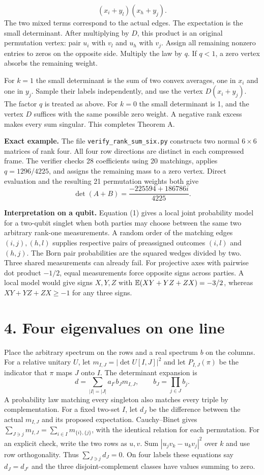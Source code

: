 \documentclass[11pt]{article}
\newcommand{\heading}[1]{\section*{\color{ink}#1}}
\begin{document}
\[
 (x_i+y_l)(x_h+y_j).
\]
The two mixed terms correspond to the actual edges. The expectation is the small determinant. After multiplying by $D$, this product is an original permutation vertex: pair $u_i$ with $v_l$ and $u_h$ with $v_j$. Assign all remaining nonzero entries to zeros on the opposite side. Multiply the law by $q$. If $q<1$, a zero vertex absorbs the remaining weight.
\par For $k=1$ the small determinant is the sum of two convex averages, one in $x_i$ and one in $y_j$. Sample their labels independently, and use the vertex $D(x_i+y_j)$. The factor $q$ is treated as above. For $k=0$ the small determinant is 1, and the vertex $D$ suffices with the same possible zero weight. A negative rank excess makes every sum singular. This completes Theorem A.
\par\textbf{Exact example.} The file \texttt{verify\_rank\_sum\_six.py} constructs two normal $6\times6$ matrices of rank four. All four row directions are distinct in each compressed frame. The verifier checks 28 coefficients using 20 matchings, applies $q=1296/4225$, and assigns the remaining mass to a zero vertex. Direct evaluation and the resulting 21 permutation weights both give
\[
 \det(A+B)=\frac{-225594+186786i}{4225}.
\]
\par\textbf{Interpretation on a qubit.} Equation (1) gives a local joint probability model for a two-qubit singlet when both parties may choose between the same two arbitrary rank-one measurements. A random order of the matching edges $(i,j),(h,l)$ supplies respective pairs of preassigned outcomes $(i,l)$ and $(h,j)$. The Born pair probabilities are the squared wedges divided by two. Three shared measurements can already fail. For projective axes with pairwise dot product $-1/2$, equal measurements force opposite signs across parties. A local model would give signs $X,Y,Z$ with $\mathbb E(XY+YZ+ZX)=-3/2$, whereas $XY+YZ+ZX\ge-1$ for any three signs.
\newpage
\heading{4. Four eigenvalues on one line}
Place the arbitrary spectrum on the rows and a real spectrum $b$ on the columns. For a relative unitary $U$, let $m_{I,J}=|\det U[I,J]|^2$ and let $P_{I,J}(\pi)$ be the indicator that $\pi$ maps $J$ onto $I$. The determinant expansion is
\[
 d=\sum_{|I|=|J|} a_{I^c} b_J m_{I,J},\qquad b_J=\prod_{j\in J}b_j .
\]
A probability law matching every singleton also matches every triple by complementation. For a fixed two-set $I$, let $d_J$ be the difference between the actual $m_{I,J}$ and its proposed expectation. Cauchy--Binet gives $\sum_{J\ni j}m_{I,J}=\sum_{i\in I}m_{\{i\},\{j\}}$, with the identical relation for each permutation. For an explicit check, write the two rows as $u,v$. Sum $|u_jv_k-u_kv_j|^2$ over $k$ and use row orthogonality. Thus $\sum_{J\ni j}d_J=0$. On four labels these equations say $d_J=d_{J^c}$ and the three disjoint-complement classes have values summing to zero.
\end{document}
